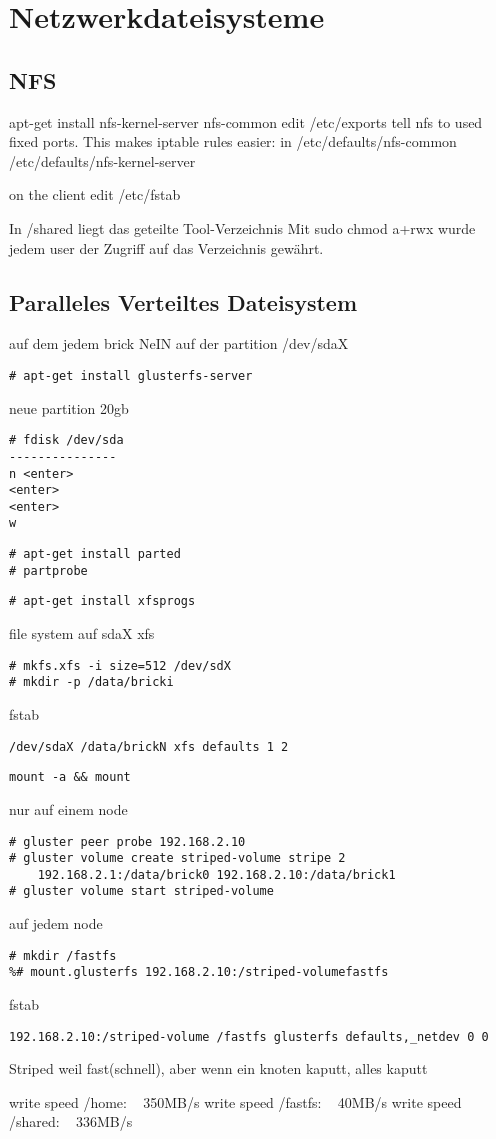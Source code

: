 \chapter{Netzwerkdateisysteme}
\section{NFS}
apt-get install nfs-kernel-server nfs-common
edit /etc/exports
tell nfs to used fixed ports. This makes iptable rules easier:
in /etc/defaults/nfs-common
/etc/defaults/nfs-kernel-server

on the client edit /etc/fstab

In /shared liegt das geteilte Tool-Verzeichnis
Mit sudo chmod a+rwx wurde jedem user der Zugriff auf das Verzeichnis gewährt.

\section{Paralleles Verteiltes Dateisystem}
auf dem jedem brick NeIN auf der partition /dev/sdaX
\begin{lstlisting}[style=Bash]
# apt-get install glusterfs-server
\end{lstlisting}
neue partition 20gb
\begin{lstlisting}[style=Bash]
# fdisk /dev/sda
---------------
n <enter>
<enter>
<enter>
w
\end{lstlisting}
\begin{lstlisting}[style=Bash]
# apt-get install parted
# partprobe
\end{lstlisting}
\begin{lstlisting}[style=Bash]
# apt-get install xfsprogs
\end{lstlisting}

file system auf sdaX xfs
\begin{lstlisting}[style=Bash]
# mkfs.xfs -i size=512 /dev/sdX
# mkdir -p /data/bricki
\end{lstlisting}
fstab
\begin{lstlisting}[style=Bash]
/dev/sdaX /data/brickN xfs defaults 1 2
\end{lstlisting}
\begin{lstlisting}[style=Bash]
mount -a && mount
\end{lstlisting}
nur auf einem node
\begin{lstlisting}[style=Bash]
# gluster peer probe 192.168.2.10
# gluster volume create striped-volume stripe 2 
    192.168.2.1:/data/brick0 192.168.2.10:/data/brick1
# gluster volume start striped-volume
\end{lstlisting}

auf jedem node
\begin{lstlisting}[style=Bash]
# mkdir /fastfs 
%# mount.glusterfs 192.168.2.10:/striped-volumefastfs
\end{lstlisting}
fstab
\begin{lstlisting}[style=Bash]
192.168.2.10:/striped-volume /fastfs glusterfs defaults,_netdev 0 0
\end{lstlisting}
Striped weil fast(schnell), aber wenn ein knoten kaputt, alles kaputt

write speed /home: ~ 350MB/s
write speed /fastfs: ~ 40MB/s
write speed /shared: ~ 336MB/s

